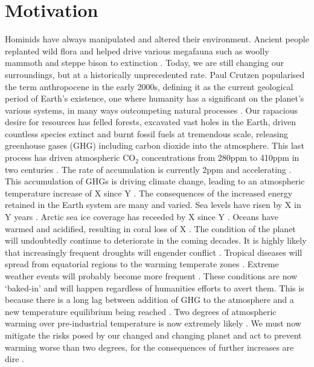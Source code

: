 \section{Motivation}
Hominids have always manipulated and altered their environment. Ancient people replanted wild flora and helped drive various megafauna such as woolly mammoth and steppe bison to extinction \cite{Mann2015} \cite{Pushkina2008}. Today, we are still changing our surroundings, but at a historically unprecedented rate. Paul Crutzen popularised the term anthropocene in the early 2000s, defining it as the current geological period of Earth's existence, one where humanity has a significant on the planet's various systems, in many ways outcompeting natural processes \cite{Crutzen2006}. Our rapacious desire for resources has felled forests, excavated vast holes in the Earth, driven countless species extinct and burnt fossil fuels at tremendous scale, releasing greenhouse gases (GHG)  including carbon dioxide into the atmosphere. This last process has driven atmospheric CO$_{2}$ concentrations from 280ppm  to 410ppm in two centuries \cite{}. The rate of accumulation is currently 2ppm and accelerating \cite{}. This accumulation of GHGs is driving climate change, leading to an atmospheric temperature increase of X since Y \cite{}. The consequences of the increased energy retained in the Earth system are many and varied. Sea levels have risen by X in Y years \cite{}. Arctic sea ice coverage has receeded by X since Y \cite{}. Oceans have warmed and acidified, resulting in coral loss of X \cite{}. The condition of the planet will undoubtedly continue to deteriorate in the coming decades. It is highly likely that increasingly frequent droughts will engender conflict \cite{}. Tropical diseases will spread from equatorial regions to the warming temperate zones \cite{}. Extreme weather events will probably become more frequent \cite{}. These conditions are now `baked-in' and will happen regardless of humanities efforts to avert them. This is because there is a long lag between addition of GHG to the atmosphere and a new temperature equilibrium being reached \cite{}. Two degrees of atmospheric warming over pre-industrial temperature is now extremely likely \cite{}. We must now mitigate the risks posed by our changed and changing planet and act to prevent warming worse than two degrees, for the consequences of further increases are dire \cite{}.

